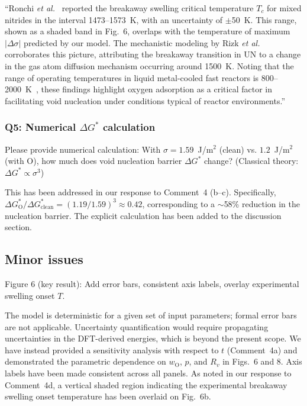 \documentclass[12pt]{article}
\begin{document}
\color{red}


``Ronchi \textit{et al.}~\cite{Ronchi1978} reported the breakaway swelling critical temperature $T_c$ for mixed nitrides in the interval 1473--1573~K, with an uncertainty of $\pm$50~K. This range, shown as a shaded band in Fig.~6, overlaps with the temperature of maximum $|\Delta \sigma|$ predicted by our model. The mechanistic modeling by Rizk \textit{et al.}~\cite{Rizk2025} corroborates this picture, attributing the breakaway transition in UN to a change in the gas atom diffusion mechanism occurring around 1500~K. Noting that the range of operating temperatures in liquid metal-cooled fast reactors is 800--2000~K~\cite{Turos1990}, these findings highlight oxygen adsorption as a critical factor in facilitating void nucleation under conditions typical of reactor environments.''

\color{black}

\subsubsection*{Q5: Numerical $\Delta G^*$ calculation}

\color{blue}
Please provide numerical calculation: With $\sigma = 1.59$~J/m$^2$ (clean) vs. $1.2$~J/m$^2$ (with O), how much does void nucleation barrier $\Delta G^*$ change? (Classical theory: $\Delta G^* \propto \sigma^3$)\\
\color{black}


This has been addressed in our response to Comment~4 (b--c). Specifically, $\Delta G^*_\text{O} / \Delta G^*_\text{clean} = (1.19/1.59)^3 \approx 0.42$, corresponding to a $\sim$58\% reduction in the nucleation barrier. The explicit calculation has been added to the discussion section.

\subsection*{Minor issues}

\color{blue}
Figure 6 (key result): Add error bars, consistent axis labels, overlay experimental swelling onset $T$.\\
\color{black}


The model is deterministic for a given set of input parameters; formal error bars are not applicable. Uncertainty quantification would require propagating uncertainties in the DFT-derived energies, which is beyond the present scope. We have instead provided a sensitivity analysis with respect to $t$ (Comment~4a) and demonstrated the parametric dependence on $w_\text{O}$, $p$, and $R_v$ in Figs.~6 and 8. Axis labels have been made consistent across all panels. As noted in our response to Comment~4d, a vertical shaded region indicating the experimental breakaway swelling onset temperature has been overlaid on Fig.~6b.\\
\end{document}
